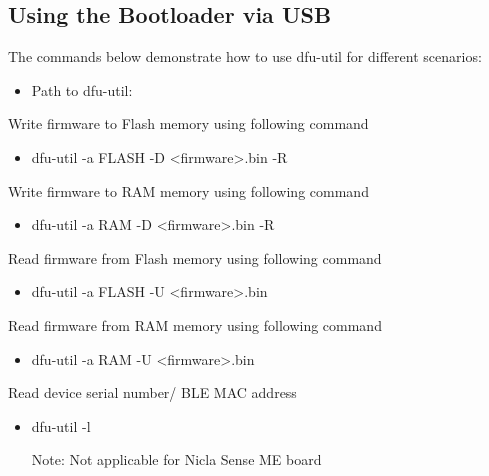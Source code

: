 \documentclass[11pt,headings=small]{scrartcl}
\begin{document}
\subsection{Using the Bootloader via USB}
The commands below demonstrate how to use dfu-util for different scenarios:

\begin{itemize}
	\item Path to dfu-util: 
\end{itemize}

Write firmware to Flash memory using following command
\begin{itemize}
	\item dfu-util -a FLASH -D <firmware>.bin -R
\end{itemize}

Write firmware to RAM memory using following command
\begin{itemize}
	\item dfu-util -a RAM -D <firmware>.bin -R
\end{itemize}

Read firmware from Flash memory using following command
\begin{itemize}
	\item dfu-util -a FLASH -U <firmware>.bin
\end{itemize}

Read firmware from RAM memory using following command
\begin{itemize}
	\item dfu-util -a RAM -U <firmware>.bin
\end{itemize}

Read device serial number/ BLE MAC address
\begin{itemize}
	\item dfu-util -l
	
Note: Not applicable for Nicla Sense ME board
\end{itemize}
\end{document}
